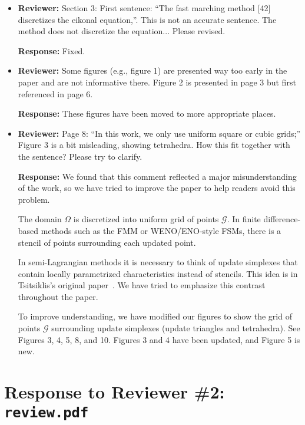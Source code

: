 \documentclass{article}
\begin{document}
\begin{itemize}

\item \textbf{Reviewer:} Section 3: First sentence: ``The fast
  marching method [42] discretizes the eikonal equation,''. This is
  not an accurate sentence. The method does not discretize the
  equation... Please revised.

  \textbf{Response:} Fixed.

\item \textbf{Reviewer:} Some figures (e.g., figure 1) are presented
  way too early in the paper and are not informative there. Figure 2
  is presented in page 3 but first referenced in page 6.

  \textbf{Response:} These figures have been moved to more appropriate
  places.

\item \textbf{Reviewer:} Page 8: ``In this work, we only use uniform
  square or cubic grids;'' Figure 3 is a bit misleading, showing
  tetrahedra. How this fit together with the sentence? Please try to
  clarify.

  \textbf{Response:} We found that this comment reflected a major
  misunderstanding of the work, so we have tried to improve the paper
  to help readers avoid this problem.

  The domain $\Omega$ is discretized into uniform grid of points
  $\mathcal{G}$. In finite difference-based methods such as the FMM or
  WENO/ENO-style FSMs, there is a stencil of points surrounding each
  updated point.

  In semi-Lagrangian methods it is necessary to think of update
  simplexes that contain locally parametrized characteristics instead
  of stencils. This idea is in Tsitsiklis's original
  paper~\cite{tsitsiklis1995efficient}. We have tried to emphasize
  this contrast throughout the paper.

  To improve understanding, we have modified our figures to show the
  grid of points $\mathcal{G}$ surrounding update simplexes (update
  triangles and tetrahedra). See Figures 3, 4, 5, 8, and 10. Figures 3
  and 4 have been updated, and Figure 5 is new.

\end{itemize}

\section*{Response to Reviewer \#2: \texttt{review.pdf}}
\end{document}

